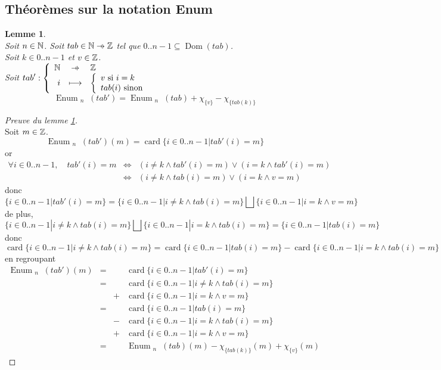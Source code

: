 \documentclass[a4paper, 11pt]{article}
\newcommand{\pto}{\mathrel{\ooalign{\hfil$\mapstochar$\hfil\cr$\to$\cr}}}
\DeclareMathOperator{\card}{card}
\DeclareMathOperator{\eenu}{Enum}
\DeclareMathOperator{\ddom}{Dom}
\newcommand{\dom}[1]{\ddom\left(#1\right)}
\newcommand{\enu}[2]{\eenu_{\substack{#1}}\left(#2\right)}
\newcommand{\ind}[1]{\chi_{#1}}
\theoremstyle{mystyle}
\newtheorem{lemma}[theorem]{Lemme}
\begin{document}
\subsection{Théorèmes sur la notation Enum}

\begin{lemma}\label{lm:enu}\mbox{}\\
Soit $n \in \mathbb{N}$. Soit $tab \in \N \pto \Z$ tel que $0..n - 1 \subseteq \dom{tab}$. \\
Soit $k \in 0..n - 1$ et $v \in \mathbb{Z}$.\\
Soit $\displaystyle tab' : \left\{\begin{array}{rcl}
    \N &\pto& \Z \\
    i &\lsto& \left\{\begin{array}{l}
         v\text{ si }i = k\\
         tab(i)\text{ sinon} 
    \end{array}\right. 
\end{array}\right.$
\[
    \enu{n}{tab'} = \enu{n}{tab} + \ind{\{v\}} - \ind{\{tab(k)\}}
\]
\end{lemma}
\begin{proof}[Preuve du lemme \ref{lm:enu}]\mbox{}\\
Soit $m \in \mathbb{Z}$.\\
\[
    \enu{n}{tab'}(m) = \card\{i \in 0..n - 1 | tab'(i) = m\}
\]
or
\[
\begin{array}{rcl}
    \forall i \in 0..n - 1,\quad tab'(i) = m &\iff& (i \neq k \land tab'(i) = m) \lor (i = k \land tab'(i) = m) \\
    &\iff& (i \neq k \land tab(i) = m) \lor (i = k \land v = m)
\end{array}
\]
donc
\[
    \{i \in 0..n - 1 | tab'(i) = m\} = \{i \in 0..n - 1 | i \neq k \land tab(i) = m\} \bigsqcup \{i \in 0..n - 1 | i = k \land v = m\}
\]
de plus,
\[
    \{i \in 0..n - 1 | i \neq k \land tab(i) = m\} \bigsqcup \{i \in 0..n - 1 | i = k \land tab(i) = m\} = \{i \in 0..n - 1 | tab(i) = m\}
\]
donc
\[
    \card\{i \in 0..n - 1 | i \neq k \land tab(i) = m\} = \card\{i \in 0..n - 1 | tab(i) = m\} - \card\{i \in 0..n - 1 | i = k \land tab(i) = m\}
\]
en regroupant
\[
    \begin{array}{rccl}
        \enu{n}{tab'}(m) &=&& \card\{i \in 0..n - 1 | tab'(i) = m\}\\
         &=&& \card\{i \in 0..n - 1 | i \neq k \land tab(i) = m\} \\
         &&+& \card\{i \in 0..n - 1 | i = k \land v = m\} \\ 
         &=&& \card\{i \in 0..n - 1 | tab(i) = m\} \\
         &&-& \card\{i \in 0..n - 1 | i = k \land tab(i) = m\} \\
         &&+& \card\{i \in 0..n - 1 | i = k \land v = m\} \\
         &=&& \enu{n}{tab}(m) - \ind{\{tab(k)\}}(m) + \ind{\{v\}}(m)
    \end{array}
\]
\end{proof}
\end{document}
